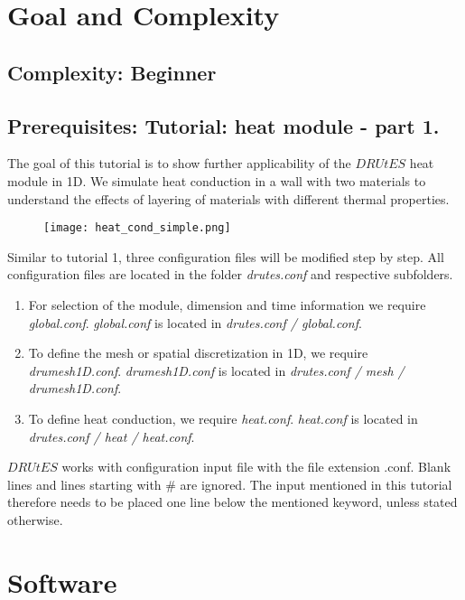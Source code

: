 \documentclass[
10pt, %
a4paper, %
oneside, %
headinclude,footinclude, %
BCOR5mm, %
]{scrartcl}
\begin{document}
\section{Goal and Complexity}
\subsection*{Complexity: Beginner}

\subsection*{Prerequisites: Tutorial: heat module - part 1.}

The goal of this tutorial is to show further applicability of the $DRUtES$ heat module in 1D. We simulate heat conduction in a wall with two materials to understand the effects of layering of materials with different thermal properties.\medskip

\begin{figure}[!h]
\centering
\texttt{[image: heat\_cond\_simple.png]}
\end{figure}

Similar to tutorial 1, three configuration files will be modified step by step. All configuration files are located in the folder \emph{drutes.conf} and respective subfolders. \begin{enumerate}
\item For selection of the module, dimension and time information we require \emph{global.conf}.  \emph{global.conf} is located in \emph{drutes.conf / global.conf}. 
\item To define the mesh or spatial discretization in 1D,  we require \emph{drumesh1D.conf}. \emph{drumesh1D.conf} is located in \emph{drutes.conf / mesh / drumesh1D.conf}. 
\item To define heat conduction, we require \emph{heat.conf}. \emph{heat.conf} is located in \emph{drutes.conf / heat / heat.conf}. 
\end{enumerate}
$DRUtES$ works with configuration input file with the file extension .conf. Blank lines and lines starting with \# are ignored. The input mentioned in this tutorial therefore needs to be placed one line below the mentioned keyword, unless stated otherwise. 

\section{Software}
\end{document}

